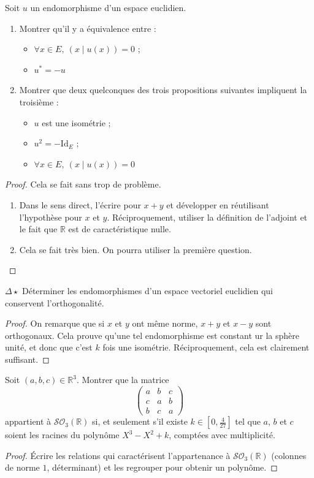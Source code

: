 \documentclass[french,a4paper]{article}
\newcommand{\R}{\mathbb{R}}
\newcommand{\st}{^*}
\theoremstyle{plain}
\theoremstyle{definition}
\theoremstyle{remark}
\begin{document}
\begin{ex}{}
	Soit $u$ un endomorphisme d'un espace euclidien.
	\begin{enumerate}
		\item Montrer qu'il y a équivalence entre :
		\begin{itemize}
			\item $\forall x\in E,\ (x\mid u(x))=0$ ;
			\item $u\st=-u$
		\end{itemize}
		\item Montrer que deux quelconques des trois propositions suivantes impliquent la troisième :
		\begin{itemize}
			\item $u$ est une isométrie ;
			\item $u^2=-\text{Id}_E$ ;
			\item $\forall x\in E,\ (x\mid u(x))=0$
		\end{itemize}
	\end{enumerate}
\end{ex}
\begin{proof}
	Cela se fait sans trop de problème.
	\begin{enumerate}
		\item Dans le sens direct, l'écrire pour $x+y$ et développer en réutilisant l'hypothèse pour $x$ et $y$. Réciproquement, utiliser la définition de l'adjoint et le fait que $\R$ est de caractéristique nulle.
		\item Cela se fait très bien. On pourra utiliser la première question.
	\end{enumerate}
\end{proof}

\begin{ex}{$\Delta\star$}
	Déterminer les endomorphismes d'un espace vectoriel euclidien qui conservent l'orthogonalité.
\end{ex}
\begin{proof}
	On remarque que si $x$ et $y$ ont même norme, $x+y$ et $x-y$ sont orthogonaux. Cela prouve qu'une tel endomorphisme est constant ur la sphère unité, et donc que c'est $k$ fois une isométrie. Réciproquement, cela est clairement suffisant.
\end{proof}

\begin{ex}{}
	Soit $(a,b,c)\in\R^3$. Montrer que la matrice $$\begin{pmatrix}
		a&b&c\\
		c&a&b\\
		b&c&a
	\end{pmatrix}$$ appartient à $\mathcal{SO}_3(\R)$ si, et seulement s'il existe $k\in\displaystyle\left[0,\frac{4}{27}\right]$ tel que $a$, $b$ et $c$ soient les racines du polynôme $X^3-X^2+k$, comptées avec multiplicité.
\end{ex}
\begin{proof}
	Écrire les relations qui caractérisent l'appartenance à $\mathcal{SO}_3(\R)$ (colonnes de norme $1$, déterminant) et les regrouper pour obtenir un polynôme.
\end{proof}
\end{document}
